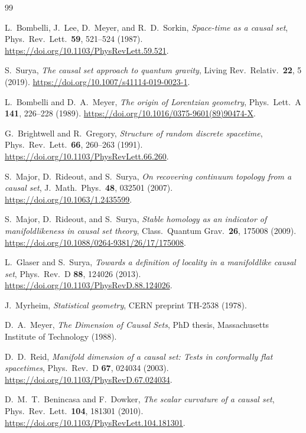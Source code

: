 \begin{thebibliography}{99}

L.~Bombelli, J.~Lee, D.~Meyer, and R.~D.~Sorkin,
\emph{Space-time as a causal set},
Phys.\ Rev.\ Lett.\ \textbf{59}, 521--524 (1987).
\url{https://doi.org/10.1103/PhysRevLett.59.521}.

S.~Surya,
\emph{The causal set approach to quantum gravity},
Living Rev.\ Relativ.\ \textbf{22}, 5 (2019).
\url{https://doi.org/10.1007/s41114-019-0023-1}.

L.~Bombelli and D.~A.~Meyer,
\emph{The origin of Lorentzian geometry},
Phys.\ Lett.\ A \textbf{141}, 226--228 (1989).
\url{https://doi.org/10.1016/0375-9601(89)90474-X}.

G.~Brightwell and R.~Gregory,
\emph{Structure of random discrete spacetime},
Phys.\ Rev.\ Lett.\ \textbf{66}, 260--263 (1991).
\url{https://doi.org/10.1103/PhysRevLett.66.260}.

S.~Major, D.~Rideout, and S.~Surya,
\emph{On recovering continuum topology from a causal set},
J.\ Math.\ Phys.\ \textbf{48}, 032501 (2007).
\url{https://doi.org/10.1063/1.2435599}.

S.~Major, D.~Rideout, and S.~Surya,
\emph{Stable homology as an indicator of manifoldlikeness in causal set theory},
Class.\ Quantum Grav.\ \textbf{26}, 175008 (2009).
\url{https://doi.org/10.1088/0264-9381/26/17/175008}.

L.~Glaser and S.~Surya,
\emph{Towards a definition of locality in a manifoldlike causal set},
Phys.\ Rev.\ D \textbf{88}, 124026 (2013).
\url{https://doi.org/10.1103/PhysRevD.88.124026}.

J.~Myrheim,
\emph{Statistical geometry},
CERN preprint TH-2538 (1978).

D.~A.~Meyer,
\emph{The Dimension of Causal Sets},
PhD thesis, Massachusetts Institute of Technology (1988).

D.~D.~Reid,
\emph{Manifold dimension of a causal set: Tests in conformally flat spacetimes},
Phys.\ Rev.\ D \textbf{67}, 024034 (2003).
\url{https://doi.org/10.1103/PhysRevD.67.024034}.

D.~M.~T.~Benincasa and F.~Dowker,
\emph{The scalar curvature of a causal set},
Phys.\ Rev.\ Lett.\ \textbf{104}, 181301 (2010).
\url{https://doi.org/10.1103/PhysRevLett.104.181301}.


\end{thebibliography}
